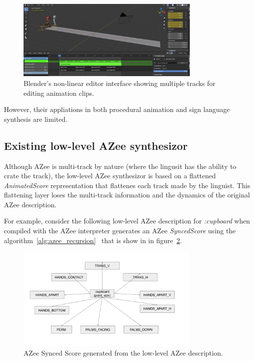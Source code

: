 \documentclass[../../main.tex]{subfiles}
\begin{document}
\begin{figure}[h]
    \centering
    \includegraphics[width=0.8\textwidth]{chapters/multi_track/images/nle_blender.png}
    \caption{Blender's non-linear editor interface showing multiple tracks for editing animation clips.}
    \label{fig:nle_blender}
\end{figure}

However, their appliations in both procedural animation and sign language synthesis are limited.

\subsection{Existing low-level AZee synthesizor}
\label{ch:multi_track:related_work:old_azee_synthesizor}

Although AZee is multi-track by nature (where the lingusit has the ability to crate the track), the low-level AZee synthesizor is based on a flattened \emph{AnimatedScore} representation that flattenes each track made by the linguist. This flattening layer loses the multi-track information and the dynamics of the original AZee description. 

For example, consider the following low-level AZee description for \emph{:cupboard} when compiled with the AZee interpreter generates an AZee \emph{SyncedScore} using the algorithm~\ref{alg:azee_recursion}~\cite{filhol2017synthesizing} that is show in in figure~\ref{fig:azee_synced_score}.

\begin{figure}[h]
    \centering
    \includegraphics[width=0.8\textwidth]{chapters/multi_track/images/azee_synced_score.png}
    \caption{AZee Synced Score generated from the low-level AZee description.}
    \label{fig:azee_synced_score}
\end{figure}
\end{document}

